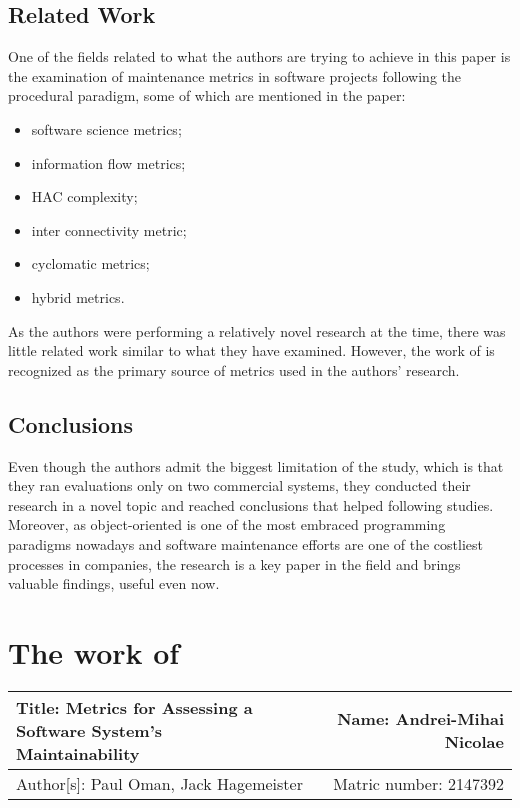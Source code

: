\documentclass[a4paper,12pt]{article}
\begin{document}
\subsection{Related Work}
One of the fields related to what the authors are trying to achieve in this
paper is the examination of maintenance metrics in software projects following
the procedural paradigm, some of which are mentioned in the paper:
 \begin{itemize}
  \item \citet{halstead1977elements} software science metrics;
  \item \citet{henry1981software} information flow metrics;
  \item \citet{bail1988program} HAC complexity;
  \item \citet{robillard1989interconnectivity} inter connectivity metric;
  \item \citet{mccabe1976complexity} cyclomatic metrics;
  \item \citet{adamov1990proposal} hybrid metrics.
 \end{itemize}
As the authors were performing a relatively novel research at the time, 
there was little related work similar to what they have examined. However,
the work of \citet{chidamber1994metrics} is recognized as the primary
source of metrics used in the authors' research.

\subsection{Conclusions}
Even though the authors admit the biggest limitation of the study, which is
that they ran evaluations only on two commercial systems, they conducted their research
in a novel topic and reached conclusions that helped following studies. Moreover, 
as object-oriented is one of the most embraced programming paradigms nowadays and 
software maintenance efforts are one of the costliest processes in companies, the
research is a key paper in the field and brings valuable findings, useful even now.
 
\section{The work of \cite{oman1992metrics}}

 \begin{center}
   \begin{tabular}{ | l | r | }
    \hline
    \parbox[t]{5cm}{Title: Metrics for Assessing a Software System's
                    \\  Maintainability} 
     & Name: Andrei-Mihai Nicolae \\ 
     \hline
     Author[s]: Paul Oman, Jack Hagemeister & Matric number: 2147392 \\
    \hline
   \end{tabular}
 \end{center}
\end{document}
